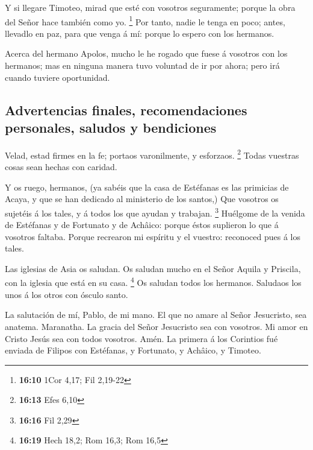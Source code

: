  Y si llegare Timoteo, mirad que esté con vosotros
seguramente; porque la obra del Señor hace también como yo. \footnote{\textbf{16:10}
  1Cor 4,17; Fil 2,19-22}  Por tanto, nadie le tenga en
poco; antes, llevadlo en paz, para que venga á mí: porque lo espero con
los hermanos.

 Acerca del hermano Apolos, mucho le he rogado que fuese á
vosotros con los hermanos; mas en ninguna manera tuvo voluntad de ir por
ahora; pero irá cuando tuviere oportunidad.

\hypertarget{advertencias-finales-recomendaciones-personales-saludos-y-bendiciones}{%
\subsection{Advertencias finales, recomendaciones personales, saludos y
bendiciones}\label{advertencias-finales-recomendaciones-personales-saludos-y-bendiciones}}

 Velad, estad firmes en la fe; portaos varonilmente, y
esforzaos. \footnote{\textbf{16:13} Efes 6,10}  Todas
vuestras cosas sean hechas con caridad.

 Y os ruego, hermanos, (ya sabéis que la casa de Estéfanas
es las primicias de Acaya, y que se han dedicado al ministerio de los
santos,)  Que vosotros os sujetéis á los tales, y á todos
los que ayudan y trabajan. \footnote{\textbf{16:16} Fil 2,29}
 Huélgome de la venida de Estéfanas y de Fortunato y de
Achâico: porque éstos suplieron lo que á vosotros faltaba. 
Porque recrearon mi espíritu y el vuestro: reconoced pues á los tales.

 Las iglesias de Asia os saludan. Os saludan mucho en el
Señor Aquila y Priscila, con la iglesia que está en su casa. \footnote{\textbf{16:19}
  Hech 18,2; Rom 16,3; Rom 16,5}  Os saludan todos los
hermanos. Saludaos los unos á los otros con ósculo santo.

 La salutación de mí, Pablo, de mi mano.  El
que no amare al Señor Jesucristo, sea anatema. Maranatha. 
La gracia del Señor Jesucristo sea con vosotros.  Mi amor
en Cristo Jesús sea con todos vosotros. Amén. La primera á los Corintios
fué enviada de Filipos con Estéfanas, y Fortunato, y Achâico, y Timoteo.
